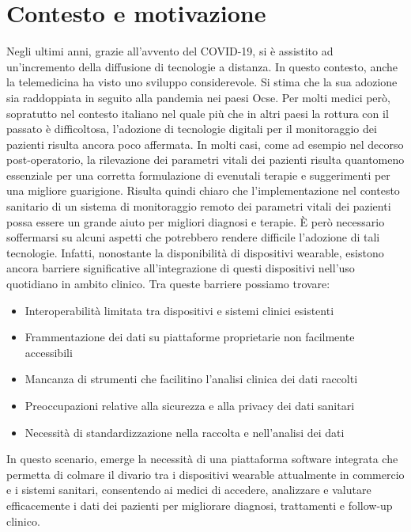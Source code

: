 \documentclass[12pt,a4paper,oneside]{report}
\begin{document}
\section{Contesto e motivazione}
Negli ultimi anni, grazie all'avvento del COVID-19, si è assistito ad un'incremento della diffusione di tecnologie a distanza. In questo contesto, anche la telemedicina ha visto uno sviluppo considerevole. Si stima che la sua adozione sia raddoppiata in seguito alla pandemia nei paesi Ocse\cite{msd2025}.
Per molti medici però, sopratutto nel contesto italiano nel quale più che in altri paesi la rottura con il passato è difficoltosa, l'adozione di tecnologie digitali per il monitoraggio dei pazienti risulta ancora poco affermata\cite{anastasio2023}.
In molti casi, come ad esempio nel decorso post-operatorio, la rilevazione dei parametri vitali dei pazienti risulta quantomeno essenziale per una corretta formulazione di evenutali terapie e suggerimenti per una migliore guarigione.
Risulta quindi chiaro che l'implementazione nel contesto sanitario di un sistema di monitoraggio remoto dei parametri vitali dei pazienti possa essere un grande aiuto per migliori diagnosi e terapie.
È però necessario soffermarsi su alcuni aspetti che potrebbero rendere difficile l'adozione di tali tecnologie. Infatti, nonostante la disponibilità di dispositivi wearable, esistono ancora barriere significative all'integrazione di questi dispositivi nell'uso quotidiano in ambito clinico. Tra queste barriere possiamo trovare:

\begin{itemize}
    \item Interoperabilità limitata tra dispositivi e sistemi clinici esistenti
    \item Frammentazione dei dati su piattaforme proprietarie non facilmente accessibili
    \item Mancanza di strumenti che facilitino l'analisi clinica dei dati raccolti
    \item Preoccupazioni relative alla sicurezza e alla privacy dei dati sanitari
    \item Necessità di standardizzazione nella raccolta e nell'analisi dei dati
\end{itemize}

In questo scenario, emerge la necessità di una piattaforma software integrata che permetta di colmare il divario tra i dispositivi wearable attualmente in commercio e i sistemi sanitari, consentendo ai medici di accedere, analizzare e valutare efficacemente i dati dei pazienti per migliorare diagnosi, trattamenti e follow-up clinico.
\end{document}
